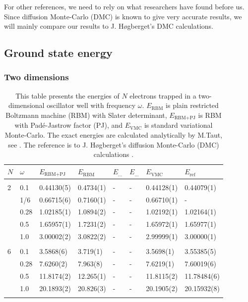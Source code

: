 For other references, we need to rely on what researchers have found before us. Since diffusion Monte-Carlo (DMC) is known to give very accurate results, we will mainly compare our results to J. Høgberget's DMC calculations. \cite{hogberget_quantum_2013}

\subsection{Ground state energy}

\subsubsection{Two dimensions}

\begin{table} [H]
	\caption{This table presents the energies of $N$ electrons trapped in a two-dimensional oscillator well with frequency $\omega$. $E_{\text{RBM}}$ is plain restricted Boltzmann machine (RBM) with Slater determinant, $E_{\text{RBM+PJ}}$ is RBM with Padé-Jastrow factor (PJ), and $E_{\text{VMC}}$ is standard variational Monte-Carlo. The exact energies are calculated analytically by M.Taut, see \cite{taut_two_1994}. The reference is to J. Høgberget's diffusion Monte-Carlo (DMC) calculations \cite{hogberget_quantum_2013}.} 
	\begin{tabularx}{\textwidth}{l:l|XXXXXX} \hline\hline
		\label{tab:quantumdotswinteraction2D}
		$N$ & $\omega$ & $E_{\text{RBM+PJ}}$ & $E_{\text{RBM}}$ & $E_{\text{...}}$ & $E_{\text{...}}$ & $E_{\text{VMC}}$ & $E_{\text{ref}} $ \\ \hline \\
		2 & 0.1 & 0.44130(5) & 0.4734(1) & - & - & 0.44128(1) & 0.44079(1)\\ 
		& 1/6 & 0.66715(6) & 0.7160(1) & - & - & 0.66710(1) & - \\
		& 0.28 & 1.02185(1) & 1.0894(2) & - & - & 1.02192(1) & 1.02164(1) \\
		& 0.5 & 1.65957(1) & 1.7231(2) & - & - & 1.65972(1) & 1.65977(1)  \\
		& 1.0 & 3.00002(2) & 3.0822(2) & - & - & 2.99999(1) & 3.00000(1) \\ \hdashline \\

		6 & 0.1 & 3.5868(6) & 3.719(1) & - & - & 3.5698(1) & 3.55385(5) \\ 
		& 0.28 & 7.6260(2) & 7.963(8) & - & - & 7.6219(1) & 7.60019(6) \\
		& 0.5 & 11.8174(2) & 12.265(1) & - & - & 11.8115(2) & 11.78484(6) \\
		& 1.0 & 20.1893(2) & 20.826(3) & - & - & 20.1905(2) & 20.15932(8) \\ \hdashline \\
		

\end{tabularx}
\end{table}
